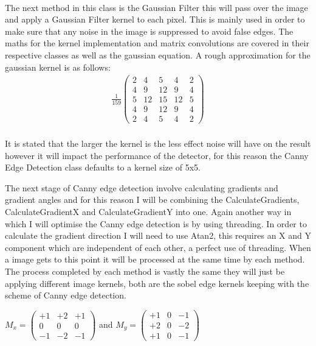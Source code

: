 \begin{FlushLeft}
    \\ \bk

    The next method in this class is the Gaussian Filter this will pass over the image and apply a Gaussian Filter kernel to each pixel. This is mainly used in order to make sure that any noise in the image is suppressed to avoid false edges. The maths for the kernel implementation and matrix convolutions are covered in their respective classes as well as the gaussian equation. A rough approximation for the gaussian kernel is as follows:\\

    \begin{gather*}
        \frac{1}{159}\begin{pmatrix}
            2 & 4 & 5 & 4 & 2 \\
            4 & 9 & 12 & 9 & 4 \\
            5 & 12 & 15 & 12 & 5 \\
            4 & 9 & 12 & 9 & 4 \\
            2 & 4 & 5 & 4 & 2
        \end{pmatrix}
    \end{gather*} \\

    It is stated that the larger the kernel is the less effect noise will have on the result however it will impact the performance of the detector, for this reason the Canny Edge Detection class defaults to a kernel size of 5x5. \\ \bk

    The next stage of Canny edge detection involve calculating gradients and gradient angles and for this reason I will be combining the CalculateGradients, CalculateGradientX and CalculateGradientY into one. Again another way in which I will optimise the Canny edge detection is by using threading. In order to calculate the gradient direction I will need to use Atan2, this requires an X and Y component which are independent of each other, a perfect use of threading. When a image gets to this point it will be processed at the same time by each method. The process completed by each method is vastly the same they will just be applying different image kernels, both are the sobel edge kernels keeping with the scheme of Canny edge detection. \\ \bk   

    \begin{center}
        
        $
        M_x = \begin{pmatrix}
            +1 & +2 & +1 \\
            0 & 0 & 0 \\
            -1 & -2 & -1
        \end{pmatrix}
    $ 
    and $ M_y = \begin{pmatrix}
            +1 & 0 & -1 \\
            +2 & 0 & -2 \\
            +1 & 0 & -1 
        \end{pmatrix}
    $
    \end{center} \\
 

\end{FlushLeft}
